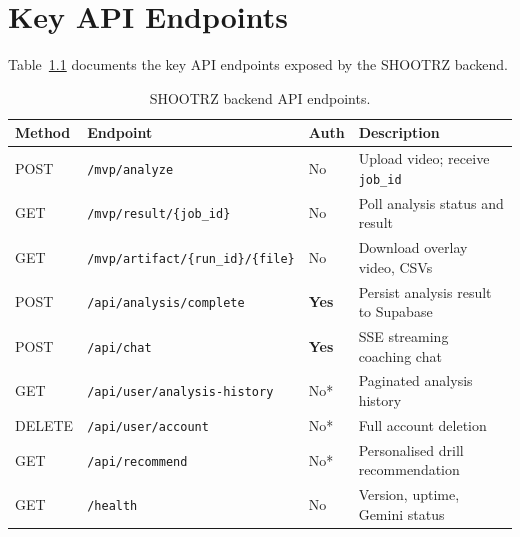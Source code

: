 \chapter{Key API Endpoints}
\label{app:api}

Table~\ref{tab:api_endpoints} documents the key API endpoints exposed by the SHOOTRZ backend.

\begin{table}[H]
  \centering
  \caption{SHOOTRZ backend API endpoints.}
  \label{tab:api_endpoints}
  \begin{tabularx}{\textwidth}{p{1.5cm}p{6.4cm}p{1cm}X}
    \toprule
    \textbf{Method} & \textbf{Endpoint} & \textbf{Auth} & \textbf{Description} \\
    \midrule
    POST   & \texttt{/mvp/analyze}                       & No           & Upload video; receive \texttt{job\_id} \\
    GET    & \texttt{/mvp/result/\{job\_id\}}            & No           & Poll analysis status and result \\
    GET    & \texttt{/mvp/artifact/\{run\_id\}/\{file\}} & No           & Download overlay video, CSVs \\
    POST   & \texttt{/api/analysis/complete}             & \textbf{Yes} & Persist analysis result to Supabase \\
    POST   & \texttt{/api/chat}                          & \textbf{Yes} & SSE streaming coaching chat \\
    GET    & \texttt{/api/user/analysis-history}         & No*          & Paginated analysis history \\
    DELETE & \texttt{/api/user/account}                  & No*          & Full account deletion \\
    GET    & \texttt{/api/recommend}                     & No*          & Personalised drill recommendation \\
    GET    & \texttt{/health}                            & No           & Version, uptime, Gemini status \\
    \bottomrule
  \end{tabularx}
\end{table}


